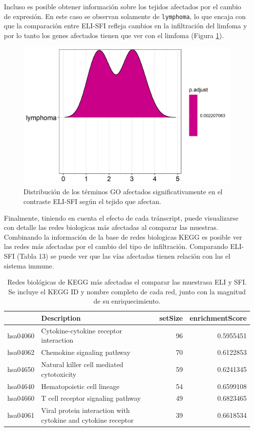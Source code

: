 \documentclass[
]{article}
\begin{document}
Incluso es posible obtener información sobre los tejidos afectados por
el cambio de expresión. En este caso se observan solamente de
\texttt{lymphoma}, lo que encaja con que la comparación entre ELI-SFI
refleja cambios en la infiltración del limfoma y por lo tanto los genes
afectados tienen que ver con el limfoma (Figura \ref{fig:Fig19}).

\begin{figure}

{\centering \includegraphics[width=0.8\linewidth]{results/6.GOterms/4.GOtiss} 

}

\caption{Distribución de los términos GO afectados significativamente en el contraste ELI-SFI según el tejido que afectan.}\label{fig:Fig19}
\end{figure}

Finalmente, tiniendo en cuenta el efecto de cada tránscript, puede
visualizarse con detalle las redes biologicas más afectadas al comparar
las muestras. Combinando la información de la base de redes biologicas
KEGG es posible ver las redes más afectadas por el cambio del tipo de
infiltración. Comparando ELI-SFI (Tabla 13) se puede ver que las vías
afectadas tienen relación con las el sistema immune.

\begin{table}

\caption{\label{tab:unnamed-chunk-8}Redes biológicas de KEGG más afectadas el comparar las muestrasa ELI y SFI. Se incluye el KEGG ID y nombre completo de cada red, junto con la magnitud de su enriquecimiento.}
\centering
\begin{tabular}[t]{llrr}
\toprule
  & Description & setSize & enrichmentScore\\
\midrule
hsa04060 & Cytokine-cytokine receptor interaction & 96 & 0.5955451\\
hsa04062 & Chemokine signaling pathway & 70 & 0.6122853\\
hsa04650 & Natural killer cell mediated cytotoxicity & 59 & 0.6241345\\
hsa04640 & Hematopoietic cell lineage & 54 & 0.6599108\\
hsa04660 & T cell receptor signaling pathway & 49 & 0.6823465\\
\addlinespace
hsa04061 & Viral protein interaction with cytokine and cytokine receptor & 39 & 0.6618534\\
\bottomrule
\end{tabular}
\end{table}
\end{document}
